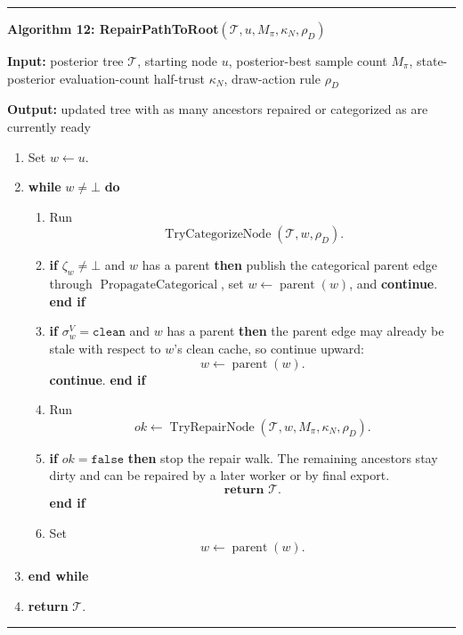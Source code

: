 \documentclass[11pt]{article}
\newcommand{\Tree}{\mathcal{T}}
\newcommand{\TryRepairNode}{\operatorname{TryRepairNode}}
\newcommand{\TryCategorizeNode}{\operatorname{TryCategorizeNode}}
\newcommand{\PropagateCategorical}{\operatorname{PropagateCategorical}}
\newenvironment{algorithmblock}[1]
{
  \par\medskip
  \noindent\hrule\par\smallskip
  \noindent\textbf{#1}
  \par\smallskip
}
{
  \par\smallskip\noindent\hrule\par\medskip
}
\newcommand{\Input}{\textbf{Input: }}
\newcommand{\Output}{\textbf{Output: }}
\newcommand{\Return}{\textbf{return }}
\newcommand{\If}{\textbf{if }}
\newcommand{\Then}{\textbf{ then }}
\newcommand{\EndIf}{\textbf{end if}}
\newcommand{\While}{\textbf{while }}
\newcommand{\EndWhile}{\textbf{end while}}
\newcommand{\Do}{\textbf{ do }}
\newcommand{\Continue}{\textbf{continue}}
\begin{document}
\begin{algorithmblock}{Algorithm 12: RepairPathToRoot\((\Tree,u,M_\pi,\kappa_N,\rho_D)\)}

\Input posterior tree \(\Tree\), starting node \(u\), posterior-best sample count \(M_\pi\), state-posterior evaluation-count half-trust \(\kappa_N\), draw-action rule \(\rho_D\)

\Output updated tree with as many ancestors repaired or categorized as are currently ready

\begin{enumerate}[leftmargin=2em]
  \item Set \(w\gets u\).

  \item \While \(w\ne\bot\) \Do
  \begin{enumerate}[leftmargin=2em]
    \item Run
    \[
    \TryCategorizeNode(\Tree,w,\rho_D).
    \]

    \item \If \(\zeta_w\ne\bot\) and \(w\) has a parent \Then
    publish the categorical parent edge through \(\PropagateCategorical\), set
    \(w\gets\operatorname{parent}(w)\), and \Continue.
    \EndIf

    \item \If \(\sigma^V_w=\texttt{clean}\) and \(w\) has a parent \Then
    the parent edge may already be stale with respect to \(w\)'s clean cache, so
    continue upward:
    \[
    w\gets\operatorname{parent}(w).
    \]
    \Continue.
    \EndIf

    \item Run
    \[
    ok\gets\TryRepairNode(\Tree,w,M_\pi,\kappa_N,\rho_D).
    \]

    \item \If \(ok=\texttt{false}\) \Then
    stop the repair walk. The remaining ancestors stay dirty and can be repaired
    by a later worker or by final export.
    \[
    \Return \Tree.
    \]
    \EndIf

    \item Set
    \[
    w\gets\operatorname{parent}(w).
    \]
  \end{enumerate}
  \item \EndWhile

  \item \Return \(\Tree\).
\end{enumerate}

\end{algorithmblock}
\end{document}
